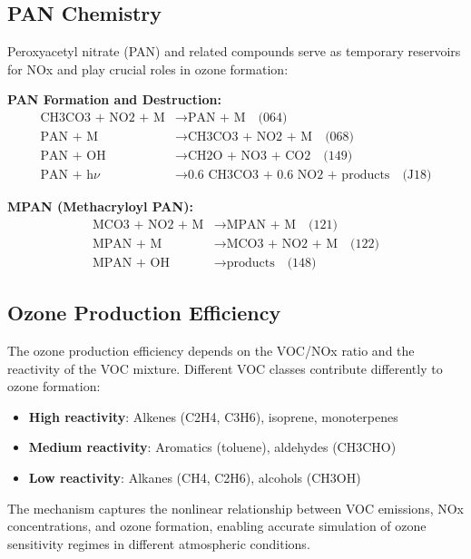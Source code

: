 \documentclass[12pt,a4paper]{article}
\begin{document}
\subsection{PAN Chemistry}

Peroxyacetyl nitrate (PAN) and related compounds serve as temporary reservoirs for NOx and play crucial roles in ozone formation:

\textbf{PAN Formation and Destruction:}
\begin{align}
\text{CH3CO3 + NO2 + M} &\rightarrow \text{PAN + M} \quad \text{(064)} \\
\text{PAN + M} &\rightarrow \text{CH3CO3 + NO2 + M} \quad \text{(068)} \\
\text{PAN + OH} &\rightarrow \text{CH2O + NO3 + CO2} \quad \text{(149)} \\
\text{PAN + h$\nu$} &\rightarrow \text{0.6 CH3CO3 + 0.6 NO2 + products} \quad \text{(J18)}
\end{align}

\textbf{MPAN (Methacryloyl PAN):}
\begin{align}
\text{MCO3 + NO2 + M} &\rightarrow \text{MPAN + M} \quad \text{(121)} \\
\text{MPAN + M} &\rightarrow \text{MCO3 + NO2 + M} \quad \text{(122)} \\
\text{MPAN + OH} &\rightarrow \text{products} \quad \text{(148)}
\end{align}

\subsection{Ozone Production Efficiency}

The ozone production efficiency depends on the VOC/NOx ratio and the reactivity of the VOC mixture. Different VOC classes contribute differently to ozone formation:

\begin{itemize}
    \item \textbf{High reactivity}: Alkenes (C2H4, C3H6), isoprene, monoterpenes
    \item \textbf{Medium reactivity}: Aromatics (toluene), aldehydes (CH3CHO)  
    \item \textbf{Low reactivity}: Alkanes (CH4, C2H6), alcohols (CH3OH)
\end{itemize}

The mechanism captures the nonlinear relationship between VOC emissions, NOx concentrations, and ozone formation, enabling accurate simulation of ozone sensitivity regimes in different atmospheric conditions.
\end{document}
